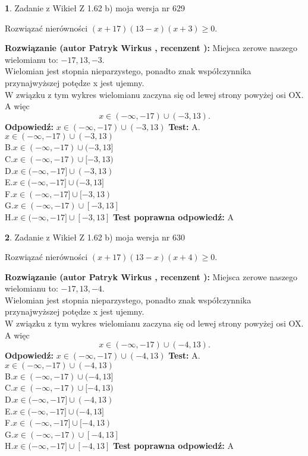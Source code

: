 \documentclass[12pt, a4paper]{article}
\theoremstyle{definition} %
\newtheorem{zad}{}
\newcommand{\zadStart}[1]{\begin{zad}#1\newline}
\newcommand{\zadStop}{\end{zad}}
\newcommand{\rozwStart}[2]{\noindent \textbf{Rozwiązanie (autor #1 , recenzent #2): }\newline}
\newcommand{\rozwStop}{\newline}
\newcommand{\odpStart}{\noindent \textbf{Odpowiedź:}\newline}
\newcommand{\odpStop}{\newline}
\newcommand{\testStart}{\noindent \textbf{Test:}\newline}
\newcommand{\testStop}{\newline}
\newcommand{\kluczStart}{\noindent \textbf{Test poprawna odpowiedź:}\newline}
\newcommand{\kluczStop}{\newline}
\begin{document}
\zadStart{Zadanie z Wikieł Z 1.62 b) moja wersja nr 629}

Rozwiązać nierówności $(x+17)(13-x)(x+3)\ge0$.
\zadStop
\rozwStart{Patryk Wirkus}{}
Miejsca zerowe naszego wielomianu to: $-17, 13, -3$.\\
Wielomian jest stopnia nieparzystego, ponadto znak współczynnika przy\linebreak najwyższej potędze x jest ujemny.\\ W związku z tym wykres wielomianu zaczyna się od lewej strony powyżej osi OX. A więc $$x \in (-\infty,-17) \cup (-3,13).$$
\rozwStop
\odpStart
$x \in (-\infty,-17) \cup (-3,13)$
\odpStop
\testStart
A.$x \in (-\infty,-17) \cup (-3,13)$\\
B.$x \in (-\infty,-17) \cup (-3,13]$\\
C.$x \in (-\infty,-17) \cup [-3,13)$\\
D.$x \in (-\infty,-17] \cup (-3,13)$\\
E.$x \in (-\infty,-17] \cup (-3,13]$\\
F.$x \in (-\infty,-17] \cup [-3,13)$\\
G.$x \in (-\infty,-17) \cup [-3,13]$\\
H.$x \in (-\infty,-17] \cup [-3,13]$
\testStop
\kluczStart
A
\kluczStop



\zadStart{Zadanie z Wikieł Z 1.62 b) moja wersja nr 630}

Rozwiązać nierówności $(x+17)(13-x)(x+4)\ge0$.
\zadStop
\rozwStart{Patryk Wirkus}{}
Miejsca zerowe naszego wielomianu to: $-17, 13, -4$.\\
Wielomian jest stopnia nieparzystego, ponadto znak współczynnika przy\linebreak najwyższej potędze x jest ujemny.\\ W związku z tym wykres wielomianu zaczyna się od lewej strony powyżej osi OX. A więc $$x \in (-\infty,-17) \cup (-4,13).$$
\rozwStop
\odpStart
$x \in (-\infty,-17) \cup (-4,13)$
\odpStop
\testStart
A.$x \in (-\infty,-17) \cup (-4,13)$\\
B.$x \in (-\infty,-17) \cup (-4,13]$\\
C.$x \in (-\infty,-17) \cup [-4,13)$\\
D.$x \in (-\infty,-17] \cup (-4,13)$\\
E.$x \in (-\infty,-17] \cup (-4,13]$\\
F.$x \in (-\infty,-17] \cup [-4,13)$\\
G.$x \in (-\infty,-17) \cup [-4,13]$\\
H.$x \in (-\infty,-17] \cup [-4,13]$
\testStop
\kluczStart
A
\kluczStop
\end{document}
